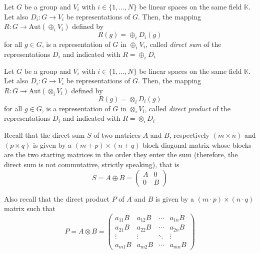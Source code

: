 \begin{proposition}
    Let $G$ be a group and $V_i$ with $i \in \{1, \ldots, N\}$ be linear spaces on the same field $\mathbb{K}$. Let also $D_i: G \rightarrow V_i$ be representations of $G$.
    Then, the mapping $R: G \rightarrow \text{Aut}(\oplus_i V_i)$ defined by
    \begin{equation*}
        R(g) = \oplus_i D_i(g)
    \end{equation*}
    for all $g \in G$, is a representation of $G$ in $\oplus_i V_i$, called \emph{direct sum} of the representations $D_i$ and indicated with $R = \oplus_i D_i$
\end{proposition}


\begin{proposition}
    Let $G$ be a group and $V_i$ with $i \in \{1, \ldots, N\}$ be linear spaces on the same field $\mathbb{K}$. Let also $D_i: G \rightarrow V_i$ be representations of $G$.
    Then, the mapping $R: G \rightarrow \text{Aut}(\otimes_i V_i)$ defined by
    \begin{equation*}
        R(g) = \otimes_i D_i(g)
    \end{equation*}
    for all $g \in G$, is a representation of $G$ in $\otimes_i V_i$, called \emph{direct product} of the representations $D_i$ and indicated with $R = \otimes_i D_i$
\end{proposition}

\begin{remark}
    Recall that the direct sum $S$ of two matrices $A$ and $B$, respectively $(m \times n)$ and $(p \times q)$ is given by a $(m + p) \times (n + q)$ block-diagonal matrix whose blocks are the two starting matrices in the order they enter the sum (therefore, the direct sum is not commutative, strictly speaking), that is
    \begin{equation*}
        S = A \oplus B = \begin{pmatrix}
            A & 0 \\
            0 & B
        \end{pmatrix}
    \end{equation*}


    Also recall that the direct product $P$ of $A$ and $B$ is given by a $(m \cdot p) \times (n \cdot q)$ matrix such that
    \begin{equation*}
        P = A \otimes B = \begin{pmatrix}
            a_{11} B & a_{12} B & \cdots & a_{1n} B \\
            a_{21} B & a_{22} B & \cdots & a_{2n} B \\
            \vdots & \vdots & \ddots & \vdots \\
            a_{m1} B & a_{m2} B & \cdots & a_{mn} B
        \end{pmatrix}
    \end{equation*}
\end{remark}


